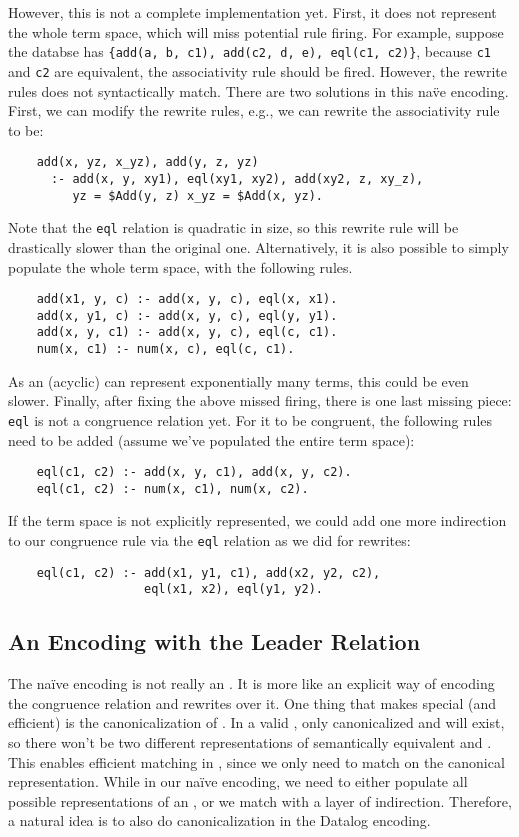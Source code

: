 However, this is not a complete \egraph implementation yet.
First, it does not represent the whole term space, 
 which will miss potential rule firing.
For example, suppose the databse has \verb|{add(a, b, c1), add(c2, d, e), eql(c1, c2)}|,
 because \verb|c1| and \verb|c2| are equivalent, 
 the associativity rule should be fired.
However, the rewrite rules does not syntactically match.
There are two solutions in this na\"ve encoding.
First, we can modify the rewrite rules, e.g.,
 we can rewrite the associativity rule to be:
\begin{verbatim}
    add(x, yz, x_yz), add(y, z, yz) 
      :- add(x, y, xy1), eql(xy1, xy2), add(xy2, z, xy_z), 
         yz = $Add(y, z) x_yz = $Add(x, yz).
\end{verbatim}
Note that the \verb|eql| relation is quadratic in size,
 so this rewrite rule will be drastically slower than the original one.
Alternatively,
 it is also possible to simply populate the whole term space, with the following rules.
\begin{verbatim}
    add(x1, y, c) :- add(x, y, c), eql(x, x1).
    add(x, y1, c) :- add(x, y, c), eql(y, y1).
    add(x, y, c1) :- add(x, y, c), eql(c, c1).
    num(x, c1) :- num(x, c), eql(c, c1).
\end{verbatim}
As an (acyclic) \egraph can represent exponentially many terms,
 this could be even slower.
Finally, after fixing the above missed firing, there is one last missing piece:
 \verb|eql| is not a congruence relation yet.
For it to be congruent,
 the following rules need to be added (assume we've populated the entire term space):
\begin{verbatim}
    eql(c1, c2) :- add(x, y, c1), add(x, y, c2).
    eql(c1, c2) :- num(x, c1), num(x, c2).
\end{verbatim}
If the term space is not explicitly represented,
 we could add one more indirection to our congruence rule 
 via the \verb|eql| relation as
 we did for rewrites:
\begin{verbatim}
    eql(c1, c2) :- add(x1, y1, c1), add(x2, y2, c2),
                   eql(x1, x2), eql(y1, y2).
\end{verbatim}

\subsection{An Encoding with the Leader Relation}

The na\"ive encoding is not really an \egraph.
It is more like an explicit way of encoding the congruence relation
 and rewrites over it.
One thing that makes \egraph special (and efficient)
 is the canonicalization of \enodes.
In a valid \egraph, 
 only canonicalized \enodes and \eclass will exist,
 so there won't be two different representations of 
 semantically equivalent \enodes and \eclasses.
This enables efficient matching in \egraph, 
 since we only need to match on the canonical representation.
While in our na\"ive encoding, 
 we need to either populate all possible representations of an \enode,
 or we match with a layer of indirection.
Therefore, 
 a natural idea is to also do canonicalization in the Datalog encoding.

